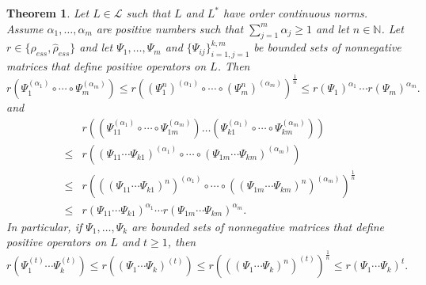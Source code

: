 \documentclass[12pt, reqno]{amsart}
\newtheorem{theorem}{Theorem}[section]
\theoremstyle{definition}
\theoremstyle{remark}
\numberwithin{equation}{section}
\newcommand{\be}{\begin{equation}}
\newcommand{\ee}{\end{equation}}
\newcommand{\NN}{\mathbb{N}}
\begin{document}
\begin{theorem}
\label{finally_ess}
Let $L\in \mathcal{L}$ such that %
$L$ and $L^*$ have order continuous norms. 
 Assume $\alpha _1, \ldots , \alpha _m$ are  positive numbers such that $\sum_{j=1}^{m} \alpha _j\ge 1$ and let $n \in \NN$.  Let  $r\in \{ \rho _{ess}, \hat{\rho} _{ess}\}$  and let $\Psi_{1}, \ldots , \Psi _m$ and
 $\{\Psi_{i j}\}_{i=1, j=1}^{k, m}$ be bounded sets of nonnegative matrices that define positive operators on $L$. Then
\be
r (\Psi _1 ^{( \alpha _1)} \circ \cdots \circ \Psi _m ^{(\alpha _m)} ) \le  r ((\Psi _1 ^n ) ^{( \alpha _1)} \circ \cdots \circ (\Psi _m ^n) ^{(\alpha _m)} ) ^{ \frac{1}{n}} \le
r(\Psi _1)^{ \alpha _1} \, \cdots r(\Psi _m)^{\alpha _m}.
\label{gsh_ref_ess}
\ee
and
%
\begin{eqnarray}
\nonumber
& & r \left(\left(\Psi_{1 1}^{(\alpha _1)} \circ \cdots \circ \Psi_{1 m}^{(\alpha _m)}\right) \ldots \left(\Psi_{k 1}^{(\alpha _1)} \circ \cdots \circ \Psi_{k m}^{(\alpha _m)} \right) \right) \\
\nonumber
& \le &r \left((\Psi_{1 1} \cdots  \Psi_{k 1})^{(\alpha _1)} \circ \cdots
\circ (\Psi_{1 m} \cdots \Psi_{k m})^{(\alpha _m)}\right)\\
\nonumber
& \le &r \left(((\Psi_{1 1} \cdots  \Psi_{k 1})^n)^{(\alpha _1)} \circ \cdots
\circ ((\Psi_{1 m} \cdots \Psi_{k m})^n)^{(\alpha _m)}\right)^{\frac{1}{n}}\\
&\le&r \left( \Psi_{1 1} \cdots  \Psi_{k 1} \right)^{\alpha _1} \cdots
r \left( \Psi_{1 m} \cdots \Psi_{k m}\right)^{\alpha _m} .
\label{lepa_ess}
\end{eqnarray}
In particular, if $\Psi _1, \ldots, \Psi_k$ are bounded sets of nonnegative matrices that define positive operators on $L$ and
 $t\ge1$, then
\be
r (\Psi _1 ^{(t)} \cdots \Psi _k ^{(t)})\le r ((\Psi _1 \cdots \Psi _k) ^{(t)}) \le r(((\Psi _1 \cdots \Psi _k)^n)^{(t)})^{\frac{1}{n}}\le r(\Psi _1 \cdots \Psi _k)^{t}.
\label{with_t_ess}
\ee 
\end{theorem}
\end{document}
